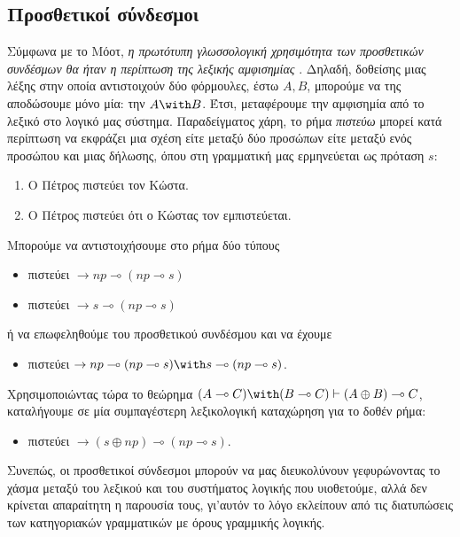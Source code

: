\documentclass [a4paper,11pt] {book}
\theoremstyle{definition}
\theoremstyle{definition}
\begin{document}
\subsection*{Προσθετικοί σύνδεσμοι}
Σύμφωνα με το Μόοτ, \textit{η πρωτότυπη γλωσσολογική χρησιμότητα των προσθετικών συνδέσμων θα ήταν η περίπτωση της λεξικής αμφισημίας} \citep{moot2002proof}. Δηλαδή, δοθείσης μιας λέξης στην οποία αντιστοιχούν δύο φόρμουλες, έστω $A,B$, μπορούμε να της αποδώσουμε μόνο μία: την $A\with B$. Έτσι, μεταφέρουμε την αμφισημία από το λεξικό στο λογικό μας σύστημα. Παραδείγματος χάρη, το ρήμα \textit{πιστεύω} μπορεί κατά περίπτωση να εκφράζει μια σχέση είτε μεταξύ δύο προσώπων είτε μεταξύ ενός προσώπου και μιας δήλωσης, όπου στη γραμματική μας ερμηνεύεται ως πρόταση $s$:
\begin{enumerate}[(1)]
\item Ο Πέτρος πιστεύει τον Κώστα.
\item Ο Πέτρος πιστεύει ότι ο Κώστας τον εμπιστεύεται.
\end{enumerate}
Μπορούμε να αντιστοιχήσουμε στο ρήμα δύο τύπους
\begin{itemize}
\item πιστεύει $\to np\multimap (np\multimap s)$
\item πιστεύει $\to s\multimap (np\multimap s)$
\end{itemize}
ή να επωφεληθούμε του προσθετικού συνδέσμου και να έχουμε
\begin{itemize}
\item πιστεύει $\to np\multimap (np\multimap s)\with s\multimap (np\multimap s)$.
\end{itemize}
Χρησιμοποιώντας τώρα το θεώρημα $(A\multimap C)\with (B\multimap C)\vdash (A\oplus B)\multimap C$, καταλήγουμε σε μία συμπαγέστερη λεξικολογική καταχώρηση για το δοθέν ρήμα:
\begin{itemize}
\item πιστεύει $\to (s\oplus np)\multimap (np\multimap s)$.
\end{itemize}
Συνεπώς, οι προσθετικοί σύνδεσμοι μπορούν να μας διευκολύνουν γεφυρώνοντας το χάσμα μεταξύ του λεξικού και του συστήματος λογικής που υιοθετούμε, αλλά δεν κρίνεται απαραίτητη η παρουσία τους, γι'αυτόν το λόγο εκλείπουν από τις διατυπώσεις των κατηγοριακών γραμματικών με όρους γραμμικής λογικής.
\end{document}
